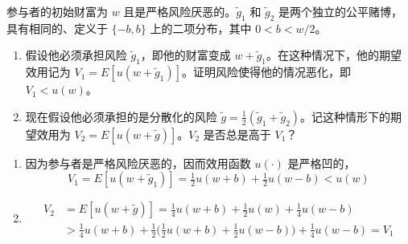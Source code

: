 \begin{problem}
 参与者的初始财富为 $w$ 且是严格风险厌恶的。$\tilde{g}_{1}$ 和 $\tilde{g}_{2}$ 是两个独立的公平赌博，具有相同的、定义于 $\{-b,b\}$ 上的二项分布，其中 $0<b<w/2$。
\begin{enumerate}[label=(\alph*)]
    \item 假设他必须承担风险 $\tilde{g}_{1}$，即他的财富变成 $w+\tilde{g}_{1}$。在这种情况下，他的期望效用记为 $V_{1}=E[u(w+\tilde{g}_{1})]$。证明风险使得他的情况恶化，即 $V_{1}<u(w)$。
    \item 现在假设他必须承担的是分散化的风险 $\tilde{g}=\frac12(\tilde{g}_{1}+\tilde{g}_{2})$。记这种情形下的期望效用为 $V_{2}=E[u(w+\tilde{g})]$。$V_{2}$ 是否总是高于 $V_{1}$？
\end{enumerate}
\end{problem}
\begin{solution}
\begin{enumerate}[label=(\alph*)]
    \item 因为参与者是严格风险厌恶的，因而效用函数 $u(\cdot)$ 是严格凹的，
    \[
        V_{1}=E[u(w+\tilde{g}_{1})]=\tfrac12 u(w+b)+\tfrac12 u(w-b)<u(w)
    \]

    \item
    \[
        \begin{aligned}
            V_{2}
            &=E[u(w+\tilde{g})]=\tfrac14 u(w+b)+\tfrac12 u(w)+\tfrac14 u(w-b)\\
            &>\tfrac14 u(w+b)+\tfrac12\bigl(\tfrac12 u(w+b)+\tfrac12 u(w-b)\bigr)+\tfrac14 u(w-b)=V_{1}
        \end{aligned}
    \]
\end{enumerate}
\end{solution}

